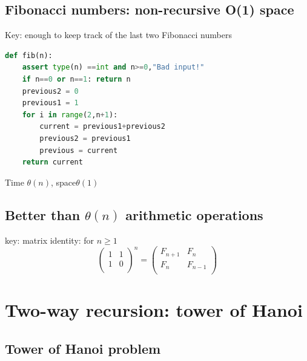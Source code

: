 \documentclass[12pt,oneside]{book}
\begin{document}
\subsection{Fibonacci numbers: non-recursive O(1) space }
Key: enough to keep track of the last two Fibonacci numbers
	{\small\begin{lstlisting}[language=python]
def fib(n):
    assert type(n) ==int and n>=0,"Bad input!"
    if n==0 or n==1: return n 
    previous2 = 0 
    previous1 = 1
    for i in range(2,n+1):
        current = previous1+previous2 
        previous2 = previous1 
        previous = current 
    return current
\end{lstlisting}}
Time $\theta(n)$, space$\theta(1)$
\subsection{Better than $\theta(n)$ arithmetic operations}
key: matrix identity: for $n\geq 1$
\[  \left( \begin{matrix}
			1 & 1 \\
			1 & 0 \\
		\end{matrix}\right)^n =  \left( \begin{matrix}
			F_{n+1} & F_n     \\
			F_n     & F_{n-1} \\
		\end{matrix}\right)\]
\section{Two-way recursion: tower of Hanoi}
\subsection{Tower of Hanoi problem}
\end{document}
